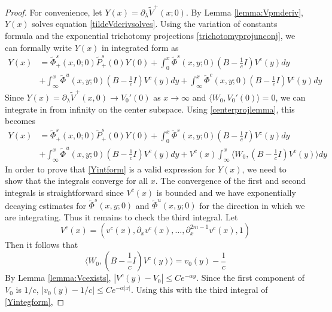 \documentclass[thesis.tex]{subfiles}
\begin{document}
\begin{lemma}
\begin{enumerate}[(i)]
\end{enumerate}
\begin{proof}
For convenience, let $Y(x) = \partial_\lambda \tilde{V}^+(x; 0)$. By Lemma \ref{lemma:Vpmderiv}, $Y(x)$ solves equation \cref{tildeVderivsolves}. Using the variation of constants formula and the exponential trichotomy projections \cref{trichotomyprojunconj}, we can formally write $Y(x)$ in integrated form as
\begin{equation}\label{Yintform}
\begin{aligned}
Y(x) &= \tilde{\Phi}^s_+(x,0; 0)\tilde{P}^s_+(0) Y(0) 
+ \int_0^x \tilde{\Phi}^s(x,y; 0)\left( B - \frac{1}{c}I \right) V^c(y) dy \\
&+ \int_{\infty}^x \tilde{\Phi}^u(x,y; 0)\left( B - \frac{1}{c}I \right) V^c(y) dy + \int_{\infty}^x \tilde{\Phi}^c(x,y; 0)\left( B - \frac{1}{c}I \right) V^c(y) dy 
\end{aligned}
\end{equation}
Since $Y(x) = \partial_\lambda \tilde{V}^+(x, 0) \rightarrow V_0'(0)$ as $x \rightarrow \infty$ and $\langle W_0, V_0'(0) \rangle = 0$, we can integrate in from infinity on the center subspace. Using \cref{centerprojlemma}, this becomes
\begin{equation}\label{Yintegform}
\begin{aligned}
Y(x) &= \tilde{\Phi}^s_+(x,0; 0)\tilde{P}^s_+(0) Y(0) 
+ \int_0^x \tilde{\Phi}^s(x,y; 0)\left( B - \frac{1}{c}I \right) V^c(y) dy \\
&+ \int_{\infty}^x \tilde{\Phi}^u(x,y; 0)\left( B - \frac{1}{c}I \right) V^c(y) dy + V^c(x) \int_{\infty}^x \langle W_0, \left( B - \frac{1}{c}I \right) V^c(y) \rangle dy 
\end{aligned}
\end{equation}
In order to prove that \cref{Yintform} is a valid expression for $Y(x)$, we need to show that the integrals converge for all $x$. The convergence of the first and second integrals is straightforward since $V^c(x)$ is bounded and we have exponentially decaying estimates for $\tilde{\Phi}^s(x,y; 0)$ and $\tilde{\Phi}^u(x,y; 0)$ for the direction in which we are integrating. Thus it remains to check the third integral. Let 
\[
V^c(x) = (v^c(x), \partial_x v^c(x), \dots, \partial_x^{2m-1} v^c(x), 1)
\]
Then it follows that
\[
\langle W_0, \left( B - \frac{1}{c}I \right) V^c(y) \rangle = v_0(y) - \frac{1}{c}
\]
By Lemma \ref{lemma:Vcexists}, $|V^c(y) - V_0|\leq Ce^{-\alpha y}$. Since the first component of $V_0$ is $1/c$, $|v_0(y) - 1/c| \leq Ce^{-\alpha |x|}$. Using this with the third integral of \cref{Yintegform}, 

\end{proof}
\end{lemma}
\end{document}
